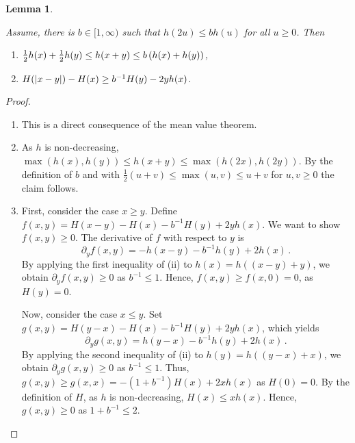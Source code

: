 \documentclass{scrartcl}
\newcommand{\equationFullstop}{\, .}
\newcommand{\eqfs}{\equationFullstop}
\theoremstyle{plain}\newtheorem{theorem}{Theorem}[section]
\newtheorem{lemma}[theorem]{Lemma}
\theoremstyle{definition}
\theoremstyle{remark}
\begin{document}
\begin{appendix}
\begin{lemma}
\begin{enumerate}[label=(\roman*)]
\end{enumerate}
Assume, there is $b \in [1,\infty)$ such that $h(2u) \leq b h(u)$ for all $u \geq 0$. Then
\begin{enumerate}[label=(\roman*),start=2]
\item $\frac12 h(x) + \frac12 h(y) \leq h (x+y) \leq b \left( h(x) + h(y) \right)$,
\item $H(\left| x-y \right|) - H(x) \geq b^{-1} H(y) - 2 y h(x)$.
\end{enumerate}
\end{lemma}
\begin{proof}
\begin{enumerate}[label=(\roman*)]
\item This is a direct consequence of the mean value theorem.
\item As $h$ is non-decreasing, $\max(h(x), h(y)) \leq h(x+y) \leq \max(h(2x), h(2y))$.
	By the definition of $b$ and with $\frac12(u+v) \leq \max(u,v) \leq u+v$ for $u,v \geq 0$ the claim follows.
\item 
	First, consider the case $x\geq y$.
 	Define $f(x,y) = H(x-y)-H(x)- b^{-1} H(y) + 2 y h(x)$.
 	We want to show $f(x, y)\geq0$.
	The derivative of $f$ with respect to $y$ is 
	\begin{equation*}
		\partial_y f(x, y) = -h(x-y) - b^{-1}h(y) + 2 h(x)\eqfs
	\end{equation*} 
	By applying the first inequality of (ii) to $h(x) = h((x-y) + y)$, we obtain $\partial_y f(x, y)  \geq 0$ as $b^{-1} \leq 1$.
	Hence, $f(x, y) \geq f(x, 0) = 0$, as $H(y) = 0$.
	
	Now, consider the case $x \leq y$. Set $g(x,y) = H(y-x) - H(x) - b^{-1} H(y) + 2 y h(x)$, which yields
	\begin{equation*}
		\partial_y g(x, y) = h(y-x) - b^{-1} h(y) + 2 h(x)\eqfs
	\end{equation*} 
	By applying the second inequality of (ii) to $h(y) = h((y-x) + x)$, we obtain $\partial_y g(x, y)  \geq 0$ as $b^{-1} \leq 1$.
	Thus, $g(x, y) \geq g(x, x) = -(1 + b^{-1}) H(x) + 2 x h(x)$ as $H(0) = 0$.
	By the definition of $H$, as $h$ is non-decreasing, $H(x) \leq x h(x)$. Hence, $g(x, y) \geq 0$ as $1 + b^{-1} \leq 2$.


\end{enumerate}
\end{proof}
\end{appendix}
\end{document}
